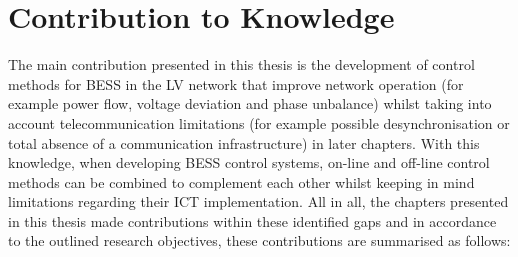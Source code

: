 \section{Contribution to Knowledge}
\label{ch-conclusions:sec:knowledge-contribution}

The main contribution presented in this thesis is the development of control methods for BESS in the LV network that improve network operation (for example power flow, voltage deviation and phase unbalance) whilst taking into account telecommunication limitations (for example possible desynchronisation or total absence of a communication infrastructure) in later chapters.
With this knowledge, when developing BESS control systems, on-line and off-line control methods can be combined to complement each other whilst keeping in mind limitations regarding their ICT implementation.
All in all, the chapters presented in this thesis made contributions within these identified gaps and in accordance to the outlined research objectives, these contributions are summarised as follows:

